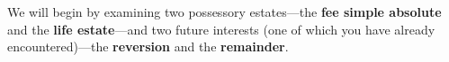 
We will begin by examining two possessory estates---the \textbf{fee simple
absolute} and the \textbf{life estate}---and two future interests (one of
which you have already encountered)---the \textbf{reversion} and the
\textbf{remainder}.

